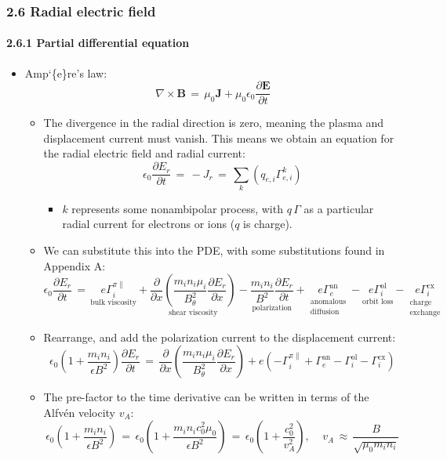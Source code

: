 \documentclass[]{article}
\providecommand{\tightlist}{%
  \setlength{\itemsep}{0pt}\setlength{\parskip}{0pt}}
\let\oldparagraph\paragraph
\renewcommand{\paragraph}[1]{\oldparagraph{#1}\mbox{}}
\begin{document}
\subsubsection{2.6 Radial electric field}\label{radial-electric-field}

\paragraph{2.6.1 Partial differential
equation}\label{partial-differential-equation}

\begin{itemize}
\item
  Amp`\{e\}re's law:
  \[\nabla \times \mathbf{B} \,=\, \mu_0 \mathbf{J} + \mu_0 \epsilon_0 \frac{\partial \mathbf{E}}{\partial t}\]

  \begin{itemize}
  \item
    The divergence in the radial direction is zero, meaning the plasma
    and displacement current must vanish. This means we obtain an
    equation for the radial electric field and radial current:
    \[\epsilon_0 \frac{\partial E_r}{\partial t} \,=\, -J_r \,=\, \sum_k \left(q_{e,i} \Gamma_{e,i}^k\right)\]

    \begin{itemize}
    \tightlist
    \item
      \(k\) represents some nonambipolar process, with \(q\,\Gamma\) as
      a particular radial current for electrons or ions (\(q\) is
      charge).
    \end{itemize}
  \item
    We can substitute this into the PDE, with some substitutions found
    in Appendix A:
    \[\epsilon_0 \frac{\partial E_r}{\partial t} \,=\, \underset{\text{bulk viscosity}}{e \Gamma_i^{\pi \parallel}} + \underset{\text{shear viscosity}}{\frac{\partial}{\partial x} \left(\frac{m_i n_i \mu_i}{B_\theta^2} \frac{\partial E_r}{\partial x}\right)} - \underset{\text{polarization}}{\frac{m_i n_i}{B^2} \frac{\partial E_r}{\partial t}} + \underset{\substack{\text{anomalous} \\ \text{diffusion}}}{e \Gamma_e^\text{an}} - \underset{\text{orbit loss}}{e \Gamma_i^\text{ol}} - \underset{\substack{\text{charge} \\ \text{exchange}}}{e \Gamma_i^\text{cx}}\]
  \item
    Rearrange, and add the polarization current to the displacement
    current:
    \[\epsilon_0 \left(1 + \frac{m_i n_i}{\epsilon B^2}\right) \frac{\partial E_r}{\partial t} \,=\, \frac{\partial}{\partial x} \left(\frac{m_i n_i \mu_i}{B_\theta^2} \frac{\partial E_r}{\partial x}\right) + e\left(-\Gamma_i^{\pi \parallel} + \Gamma_e^\text{an} - \Gamma_i^\text{ol} - \Gamma_i^\text{cx}\right)\]
  \item
    The pre-factor to the time derivative can be written in terms of the
    Alfvén velocity \(v_A\):
    \[\epsilon_0 \left(1 + \frac{m_i n_i}{\epsilon B^2}\right) \,=\, \epsilon_0 \left(1 + \frac{m_i n_i c_0^2 \mu_0}{\epsilon B^2}\right) \,=\, \epsilon_0 \left(1 + \frac{c_0^2}{v_A^2}\right), ~~~~~ v_A \,\approx\, \frac{B}{\sqrt{\mu_0 m_i n_i}}\]


\end{itemize}
\end{itemize}
\end{document}
